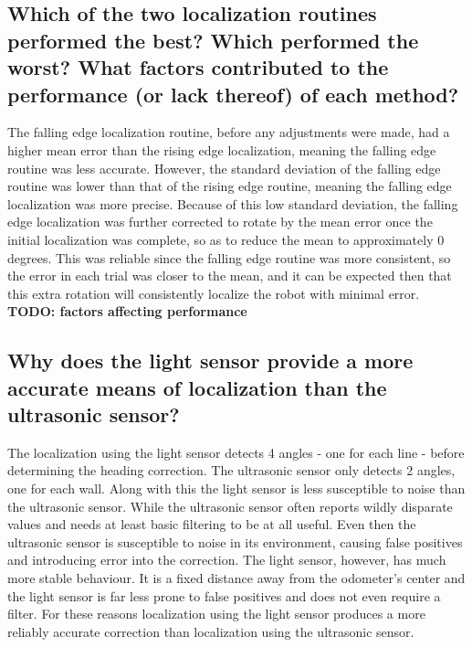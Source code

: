 \documentclass[11pt]{article}
\begin{document}
\subsection{Which of the two localization routines performed the best? Which performed the worst?
What factors contributed to the performance (or lack thereof) of each method?}
\par The falling edge localization routine, before any adjustments were made, had a higher mean error
than the rising edge localization, meaning the falling edge routine was less accurate. However, the
standard deviation of the falling edge routine was lower than that of the rising edge routine,
meaning the falling edge localization was more precise. Because of this low standard deviation, the
falling edge localization was further corrected to rotate by the mean error once the initial
localization was complete, so as to reduce the mean to approximately 0 degrees. This was reliable
since the falling edge routine was more consistent, so the error in each trial was closer to the
mean, and it can be expected then that this extra rotation will consistently localize the robot with
minimal error. \\

\textbf{TODO: factors affecting performance}

\subsection{Why does the light sensor provide a more accurate means of localization than the
ultrasonic sensor?}
\par The localization using the light sensor detects 4 angles - one for each line - before
determining the heading correction. The ultrasonic sensor only detects 2 angles, one for each wall.
Along with this the light sensor is less susceptible to noise than the ultrasonic sensor. While the
ultrasonic sensor often reports wildly disparate values and needs at least basic filtering to be at
all useful. Even then the ultrasonic sensor is susceptible to noise in its environment, causing
false positives and introducing error into the correction. The light sensor, however, has much more
stable behaviour. It is a fixed distance away from the odometer's center and the light sensor is far
less prone to false positives and does not even require a filter. For these reasons localization
using the light sensor produces a more reliably accurate correction than localization using the
ultrasonic sensor.
\end{document}
